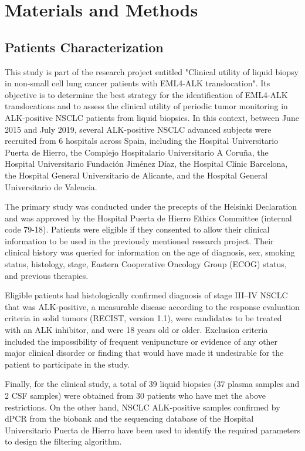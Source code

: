 \chapter{Materials and Methods}

\section{Patients Characterization}

This study is part of the research project entitled "Clinical utility of liquid biopsy in non-small cell lung cancer patients with EML4-ALK translocation". Its objective is to determine the best strategy for the identification of EML4-ALK translocations and to assess the clinical utility of periodic tumor monitoring in ALK-positive NSCLC patients from liquid biopsies. In this context, between June 2015 and July 2019, several ALK-positive NSCLC advanced subjects were recruited from 6 hospitals across Spain, including the Hospital Universitario Puerta de Hierro, the Complejo Hospitalario Universitario A Coruña, the Hospital Universitario Fundación Jiménez Díaz, the Hospital Clínic Barcelona, the Hospital General Universitario de Alicante, and the Hospital General Universitario de Valencia.

The primary study was conducted under the precepts of the Helsinki Declaration and was approved by the Hospital Puerta de Hierro Ethics Committee (internal code 79-18). Patients were eligible if they consented to allow their clinical information to be used in the previously mentioned research project. Their clinical history was queried for information on the age of diagnosis, sex, smoking status, histology, stage, Eastern Cooperative Oncology Group (ECOG) status, and previous therapies.

Eligible patients had histologically confirmed diagnosis of stage III–IV NSCLC that was ALK-positive, a measurable disease according to the response evaluation criteria in solid tumors (RECIST, version 1.1), were candidates to be treated with an ALK inhibitor, and were 18 years old or older. Exclusion criteria included the impossibility of frequent venipuncture or evidence of any other major clinical disorder or finding that would have made it undesirable for the patient to participate in the study.

Finally, for the clinical study, a total of 39 liquid biopsies (37 plasma samples and 2 CSF samples) were obtained from 30 patients who have met the above restrictions. On the other hand, NSCLC ALK-positive samples confirmed by dPCR from the biobank and the sequencing database of the Hospital Universitario Puerta de Hierro have been used to identify the required parameters to design the filtering algorithm.

